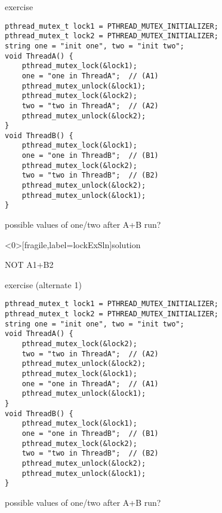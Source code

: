 \begin{frame}[fragile,label=lockEx]{exercise}
    \vspace{-0.5cm}
\begin{lstlisting}[style=smaller]
pthread_mutex_t lock1 = PTHREAD_MUTEX_INITIALIZER;
pthread_mutex_t lock2 = PTHREAD_MUTEX_INITIALIZER;
string one = "init one", two = "init two";
void ThreadA() {
    pthread_mutex_lock(&lock1);
    one = "one in ThreadA";  // (A1)
    pthread_mutex_unlock(&lock1);
    pthread_mutex_lock(&lock2);
    two = "two in ThreadA";  // (A2)
    pthread_mutex_unlock(&lock2);
}
void ThreadB() {
    pthread_mutex_lock(&lock1);
    one = "one in ThreadB";  // (B1)
    pthread_mutex_lock(&lock2);
    two = "two in ThreadB";  // (B2)
    pthread_mutex_unlock(&lock2);
    pthread_mutex_unlock(&lock1);
}
\end{lstlisting}
possible values of one/two after A+B run?
\end{frame}

\begin{frame}<0>[fragile,label=lockExSln]{solution}
\item NOT A1+B2
\end{frame}

\begin{frame}[fragile,label=lockExAlt1]{exercise (alternate 1)}
    \vspace{-0.5cm}
\begin{lstlisting}[style=smaller]
pthread_mutex_t lock1 = PTHREAD_MUTEX_INITIALIZER;
pthread_mutex_t lock2 = PTHREAD_MUTEX_INITIALIZER;
string one = "init one", two = "init two";
void ThreadA() {
    pthread_mutex_lock(&lock2);
    two = "two in ThreadA";  // (A2)
    pthread_mutex_unlock(&lock2);
    pthread_mutex_lock(&lock1);
    one = "one in ThreadA";  // (A1)
    pthread_mutex_unlock(&lock1);
}
void ThreadB() {
    pthread_mutex_lock(&lock1);
    one = "one in ThreadB";  // (B1)
    pthread_mutex_lock(&lock2);
    two = "two in ThreadB";  // (B2)
    pthread_mutex_unlock(&lock2);
    pthread_mutex_unlock(&lock1);
}
\end{lstlisting}
possible values of one/two after A+B run?
\end{frame}

